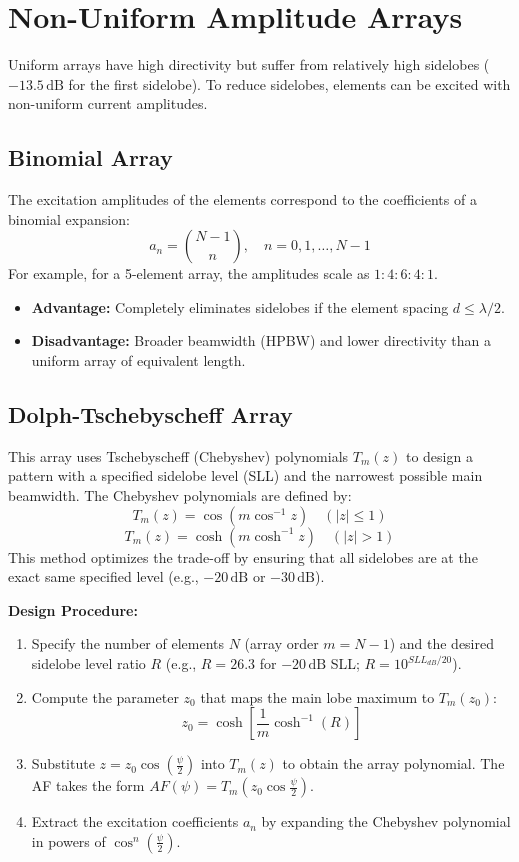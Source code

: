 \documentclass[12pt,a4paper]{article}
\begin{document}
\section{Non-Uniform Amplitude Arrays}

Uniform arrays have high directivity but suffer from relatively high sidelobes ($-13.5\,\text{dB}$ for the first sidelobe). To reduce sidelobes, elements can be excited with non-uniform current amplitudes.

\subsection{Binomial Array}
The excitation amplitudes of the elements correspond to the coefficients of a binomial expansion:
\[
a_n = \binom{N-1}{n}, \quad n = 0, 1, \dots, N-1
\]
For example, for a 5-element array, the amplitudes scale as $1 : 4 : 6 : 4 : 1$.
\begin{itemize}[leftmargin=*, itemsep=2pt]
  \item \textbf{Advantage:} Completely eliminates sidelobes if the element spacing $d \le \lambda/2$.
  \item \textbf{Disadvantage:} Broader beamwidth (HPBW) and lower directivity than a uniform array of equivalent length.
\end{itemize}

\subsection{Dolph-Tschebyscheff Array}
This array uses Tschebyscheff (Chebyshev) polynomials $T_m(z)$ to design a pattern with a specified sidelobe level (SLL) and the narrowest possible main beamwidth.
The Chebyshev polynomials are defined by:
\[
T_m(z) = \cos(m \cos^{-1} z) \quad (|z| \le 1)
\]
\[
T_m(z) = \cosh(m \cosh^{-1} z) \quad (|z| > 1)
\]
This method optimizes the trade-off by ensuring that all sidelobes are at the exact same specified level (e.g., $-20\,\text{dB}$ or $-30\,\text{dB}$).

\textbf{Design Procedure:}
\begin{enumerate}[label=\textbf{\arabic*.}, leftmargin=*, itemsep=3pt]
  \item Specify the number of elements $N$ (array order $m = N-1$) and the desired sidelobe level ratio $R$ (e.g., $R = 26.3$ for $-20\,\text{dB}$ SLL; $R = 10^{SLL_{dB}/20}$).
  \item Compute the parameter $z_0$ that maps the main lobe maximum to $T_m(z_0)$:
  \[
  z_0 = \cosh\!\left[ \frac{1}{m} \cosh^{-1}(R) \right]
  \]
  \item Substitute $z = z_0 \cos\!\left(\frac{\psi}{2}\right)$ into $T_m(z)$ to obtain the array polynomial. The AF takes the form $AF(\psi) = T_m\!\left(z_0 \cos\frac{\psi}{2}\right)$.
  \item Extract the excitation coefficients $a_n$ by expanding the Chebyshev polynomial in powers of $\cos^n\!\left(\frac{\psi}{2}\right)$.
\end{enumerate}
\end{document}
